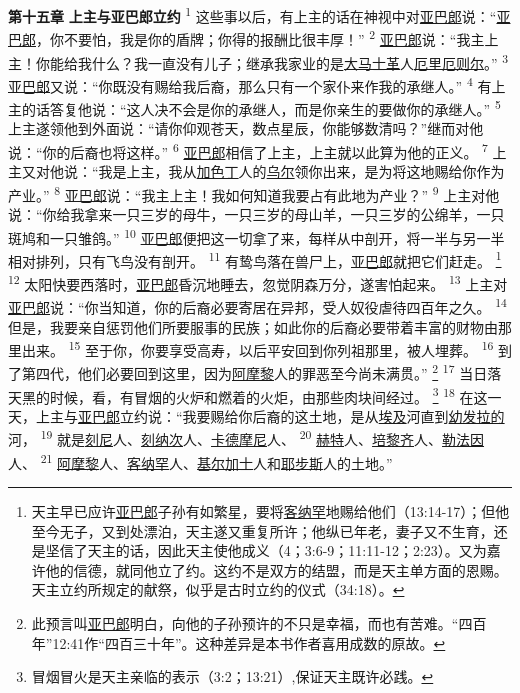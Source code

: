 \textbf{第十五章 }
\textbf{上主与亚巴郎立约 }
\textsuperscript{1}
这些事以后，有上主的话在神视中对\uline{亚巴郎}说：“\uline{亚巴郎}，你不要怕，我是你的盾牌；你得的报酬比很丰厚！”
\textsuperscript{2}
\uline{亚巴郎}说：“我主上主！你能给我什么？我一直没有儿子；继承我家业的是\uline{大马}\uline{士革}人\uline{厄里}\uline{厄则尔}。”
\textsuperscript{3}
\uline{亚巴郎}又说：“你既没有赐给我后裔，那么只有一个家仆来作我的承继人。”
\textsuperscript{4}
有上主的话答复他说：“这人决不会是你的承继人，而是你亲生的要做你的承继人。”
\textsuperscript{5}
上主遂领他到外面说：“请你仰观苍天，数点星辰，你能够数清吗？”继而对他说：“你的后裔也将这样。”
\textsuperscript{6}
\uline{亚巴郎}相信了上主，上主就以此算为他的正义。
\textsuperscript{7}
上主又对他说：“我是上主，我从\uline{加色丁}人的\uline{乌尔}领你出来，是为将这地赐给你作为产业。”
\textsuperscript{8}
\uline{亚巴郎}说：“我主上主！我如何知道我要占有此地为产业？”
\textsuperscript{9}
上主对他说：“你给我拿来一只三岁的母牛，一只三岁的母山羊，一只三岁的公绵羊，一只斑鸠和一只雏鸽。”
\textsuperscript{10}
\uline{亚巴郎}便把这一切拿了来，每样从中剖开，将一半与另一半相对排列，只有飞鸟没有剖开。
\textsuperscript{11}
有鸷鸟落在兽尸上，\uline{亚巴郎}就把它们赶走。
\footnote{天主早已应许\uline{亚巴郎}子孙有如繁星，要将\uline{客纳罕}地赐给他们（13:14-17）；但他至今无子，又到处漂泊，天主遂又重复所许；他纵已年老，妻子又不生育，还是坚信了天主的话，因此天主使他成义（4；3:6-9；11:11-12；2:23）。又为嘉许他的信德，就同他立了约。这约不是双方的结盟，而是天主单方面的恩赐。天主立约所规定的献祭，似乎是古时立约的仪式（34:18）。}
\textsuperscript{12}
太阳快要西落时，\uline{亚巴郎}昏沉地睡去，忽觉阴森万分，遂害怕起来。
\textsuperscript{13}
上主对\uline{亚巴郎}说：“你当知道，你的后裔必要寄居在异邦，受人奴役虐待四百年之久。
\textsuperscript{14}
但是，我要亲自惩罚他们所要服事的民族；如此你的后裔必要带着丰富的财物由那里出来。
\textsuperscript{15}
至于你，你要享受高寿，以后平安回到你列祖那里，被人埋葬。
\textsuperscript{16}
到了第四代，他们必要回到这里，因为\uline{阿摩黎}人的罪恶至今尚未满贯。”
\footnote{此预言叫\uline{亚巴郎}明白，向他的子孙预许的不只是幸福，而也有苦难。“四百年”12:41作“四百三十年”。这种差异是本书作者喜用成数的原故。}
\textsuperscript{17}
当日落天黑的时候，看，有冒烟的火炉和燃着的火炬，由那些肉块间经过。
\footnote{冒烟冒火是天主亲临的表示（3:2；13:21）,保证天主既许必践。}
\textsuperscript{18}
在这一天，上主与\uline{亚巴郎}立约说：“我要赐给你后裔的这土地，是从\uline{埃及}河直到\uline{幼发拉的}河，
\textsuperscript{19}
就是\uline{刻尼}人、\uline{刻纳次}人、\uline{卡德}\uline{摩尼}人、
\textsuperscript{20}
\uline{赫特}人、\uline{培黎齐}人、\uline{勒法因}人、
\textsuperscript{21}
\uline{阿摩黎}人、\uline{客纳罕}人、\uline{基尔加}\uline{士}人和\uline{耶步斯}人的土地。”


